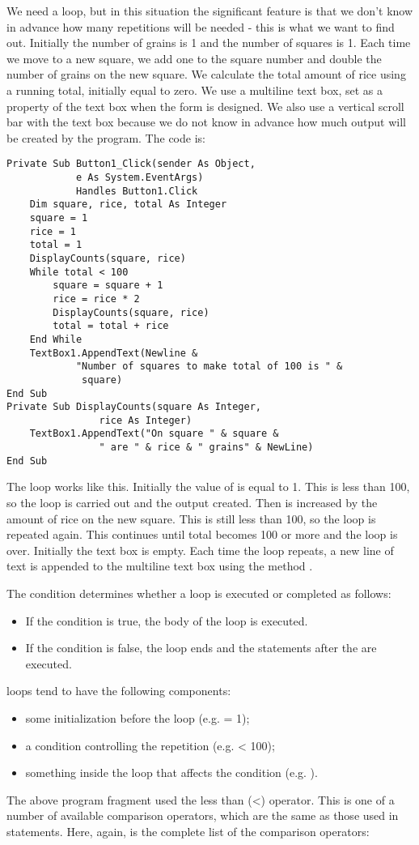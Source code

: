 		We need a loop, but in this situation the significant feature is that we don't know in advance how many repetitions will be needed - this is what we want to find out. Initially the number of grains is 1 and the number of squares is 1. Each time we move to a new square, we add one to the square number and double the number of grains on the new square. We calculate the total amount of rice using a running total, initially equal to zero. We use a multiline text box, set as a property of the text box when the form is designed. We also use a vertical scroll bar with the text box because we do not know in advance how much output will be created by the program. The code is:
		\begin{lstlisting}
Private Sub Button1_Click(sender As Object,
			e As System.EventArgs)	
			Handles Button1.Click
	Dim square, rice, total As Integer
	square = 1
	rice = 1
	total = 1
	DisplayCounts(square, rice)		
	While total < 100
		square = square + 1
		rice = rice * 2
		DisplayCounts(square, rice)
		total = total + rice
	End While
	TextBox1.AppendText(Newline &
			"Number of squares to make total of 100 is " & 
			 square)
End Sub
Private Sub DisplayCounts(square As Integer,
				rice As Integer)
	TextBox1.AppendText("On square " & square &
				" are " & rice & " grains" & NewLine)
End Sub
		\end{lstlisting}
		The  loop works like this. Initially the value of  is equal to 1. This is less than 100, so the loop is carried out and the output created. Then  is increased by the amount of rice on the new square. This is still less than 100, so the loop is repeated again. This continues until total becomes 100 or more and the loop is over. Initially the text box is empty. Each time the loop repeats, a new line of text is appended to the multiline text box using the method .
		
		The condition determines whether a  loop is executed or completed as follows:
		\begin{itemize}
	    \item If the condition is true, the body of the loop is executed.
			\item If the condition is false, the loop ends and the statements after the  are executed.
		\end{itemize}
		 loops tend to have the following components:
		\begin{itemize}
    	\item some initialization before the loop (e.g.   = 1);
	    \item a condition controlling the repetition (e.g.   < 100);
  	  \item something inside the loop that affects the condition (e.g.  ).
		\end{itemize}
		The above program fragment used the less than (<) operator. This is one of a number of available comparison operators, which are the same as those used in  statements. Here, again, is the complete list of the comparison operators:

